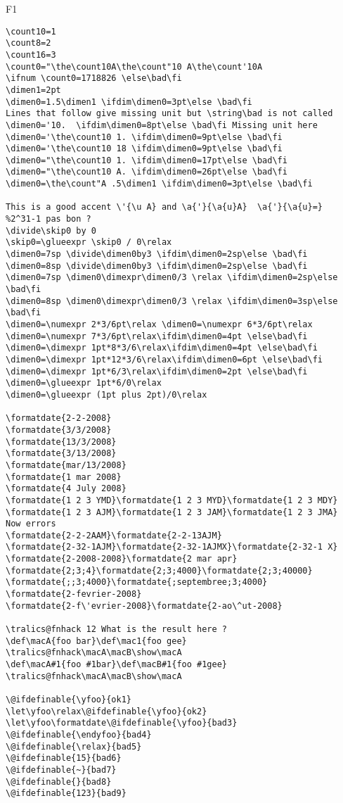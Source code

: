 \documentclass{article}
\begin{document}
\begin{filecontents+}{F1}
\begin{Verbatim}
\count10=1
\count8=2
\count16=3
\count0="\the\count10A\the\count"10 A\the\count'10A
\ifnum \count0=1718826 \else\bad\fi
\dimen1=2pt
\dimen0=1.5\dimen1 \ifdim\dimen0=3pt\else \bad\fi
Lines that follow give missing unit but \string\bad is not called
\dimen0='10.  \ifdim\dimen0=8pt\else \bad\fi Missing unit here
\dimen0='\the\count10 1. \ifdim\dimen0=9pt\else \bad\fi 
\dimen0='\the\count10 18 \ifdim\dimen0=9pt\else \bad\fi 
\dimen0="\the\count10 1. \ifdim\dimen0=17pt\else \bad\fi
\dimen0="\the\count10 A. \ifdim\dimen0=26pt\else \bad\fi 
\dimen0=\the\count"A .5\dimen1 \ifdim\dimen0=3pt\else \bad\fi

This is a good accent \'{\u A} and \a{'}{\a{u}A}  \a{'}{\a{u}=}
%2^31-1 pas bon ?  
\divide\skip0 by 0
\skip0=\glueexpr \skip0 / 0\relax
\dimen0=7sp \divide\dimen0by3 \ifdim\dimen0=2sp\else \bad\fi
\dimen0=8sp \divide\dimen0by3 \ifdim\dimen0=2sp\else \bad\fi
\dimen0=7sp \dimen0\dimexpr\dimen0/3 \relax \ifdim\dimen0=2sp\else \bad\fi
\dimen0=8sp \dimen0\dimexpr\dimen0/3 \relax \ifdim\dimen0=3sp\else \bad\fi
\dimen0=\numexpr 2*3/6pt\relax \dimen0=\numexpr 6*3/6pt\relax
\dimen0=\numexpr 7*3/6pt\relax\ifdim\dimen0=4pt \else\bad\fi
\dimen0=\dimexpr 1pt*8*3/6\relax\ifdim\dimen0=4pt \else\bad\fi
\dimen0=\dimexpr 1pt*12*3/6\relax\ifdim\dimen0=6pt \else\bad\fi
\dimen0=\dimexpr 1pt*6/3\relax\ifdim\dimen0=2pt \else\bad\fi
\dimen0=\glueexpr 1pt*6/0\relax
\dimen0=\glueexpr (1pt plus 2pt)/0\relax

\formatdate{2-2-2008}
\formatdate{3/3/2008}
\formatdate{13/3/2008}
\formatdate{3/13/2008}
\formatdate{mar/13/2008}
\formatdate{1 mar 2008}
\formatdate{4 July 2008}
\formatdate{1 2 3 YMD}\formatdate{1 2 3 MYD}\formatdate{1 2 3 MDY}
\formatdate{1 2 3 AJM}\formatdate{1 2 3 JAM}\formatdate{1 2 3 JMA}
Now errors
\formatdate{2-2-2AAM}\formatdate{2-2-13AJM}
\formatdate{2-32-1AJM}\formatdate{2-32-1AJMX}\formatdate{2-32-1 X}
\formatdate{2-2008-2008}\formatdate{2 mar apr}
\formatdate{2;3;4}\formatdate{2;3;4000}\formatdate{2;3;40000}
\formatdate{;;3;4000}\formatdate{;septembree;3;4000}
\formatdate{2-fevrier-2008}
\formatdate{2-f\'evrier-2008}\formatdate{2-ao\^ut-2008}

\tralics@fnhack 12 What is the result here ?
\def\macA{foo bar}\def\mac1{foo gee}
\tralics@fnhack\macA\macB\show\macA
\def\macA#1{foo #1bar}\def\macB#1{foo #1gee}
\tralics@fnhack\macA\macB\show\macA

\@ifdefinable{\yfoo}{ok1}
\let\yfoo\relax\@ifdefinable{\yfoo}{ok2}
\let\yfoo\formatdate\@ifdefinable{\yfoo}{bad3}
\@ifdefinable{\endyfoo}{bad4}
\@ifdefinable{\relax}{bad5}
\@ifdefinable{15}{bad6}
\@ifdefinable{~}{bad7}
\@ifdefinable{}{bad8}
\@ifdefinable{123}{bad9}



\end{Verbatim}
\end{filecontents+}
\end{document}
